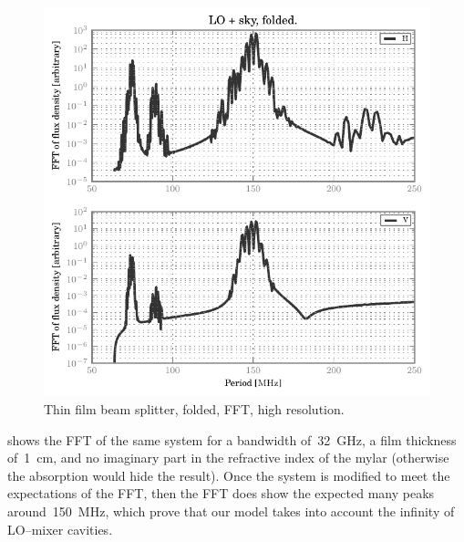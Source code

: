 \begin{figure}[hbtp]
    \centering
    \includegraphics{thin_film_beam_splitter_folded_fft_hr}
    \caption{Thin film beam splitter, folded, FFT, high resolution.}
    \label{fig:thin_film_beam_splitter_folded_fft_hr}
\end{figure}
 shows the FFT of the same system for a bandwidth of~\SI{32}{\giga\hertz}, a film thickness of~\SI{1}{\centi\meter}, and no imaginary part in the refractive index of the mylar (otherwise the absorption would hide the result).
Once the system is modified to meet the expectations of the FFT, then the FFT does show the expected many peaks around~\SI{150}{\mega\hertz}, which prove that our model takes into account the infinity of LO--mixer cavities.
